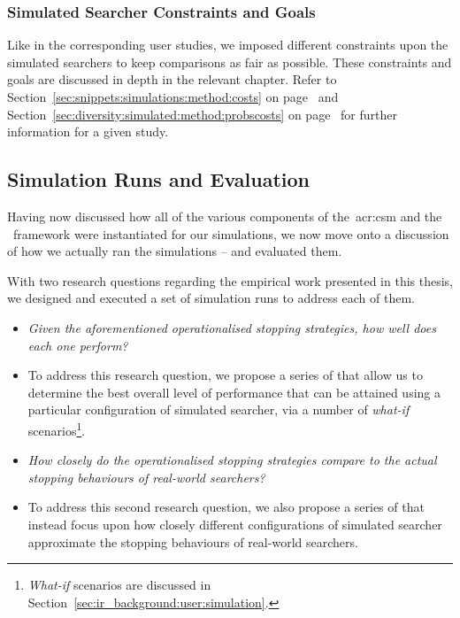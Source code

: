 \begin{table}[t!]
\begin{center}
\begin{tabulary}{\textwidth}{L{4cm}@{\CS}L{11.8cm}}
\end{tabulary}
\vspace*{-3mm}
\end{center}
\end{table}

\subsubsection{Simulated Searcher Constraints and Goals}\label{sec:method:simulation:grounding:constraints}
Like in the corresponding user studies, we imposed different constraints upon the simulated searchers to keep comparisons as fair as possible. These constraints and goals are discussed in depth in the relevant chapter. Refer to Section~\ref{sec:snippets:simulations:method:costs} on page~\pageref{sec:snippets:simulations:method:costs} and Section~\ref{sec:diversity:simulated:method:probscosts} on page~\pageref{sec:diversity:simulated:method:probscosts} for further information for a given study.

\subsection{Simulation Runs and Evaluation}\label{sec:method:simulation:runs}
Having now discussed how all of the various components of the~\gls{acr:csm} and the \simiir~framework were instantiated for our simulations, we now move onto a discussion of how we actually ran the simulations -- and evaluated them.

With two research questions regarding the empirical work presented in this thesis, we designed and executed a set of simulation runs to address each of them.

\begin{itemize}
    \item{ \emph{Given the aforementioned operationalised stopping strategies, how well does each one perform?}}
    \item[]{To address this research question, we propose a series of  that allow us to determine the best overall level of performance that can be attained using a particular configuration of simulated searcher, via a number of \emph{what-if} scenarios\footnote{\emph{What-if} scenarios are discussed in Section~\ref{sec:ir_background:user:simulation}.}.}
    
    \item{ \emph{How closely do the operationalised stopping strategies compare to the actual stopping behaviours of real-world searchers?}}
    \item[]{To address this second research question, we also propose a series of  that instead focus upon how closely different configurations of simulated searcher approximate the stopping behaviours of real-world searchers.}
\end{itemize}

